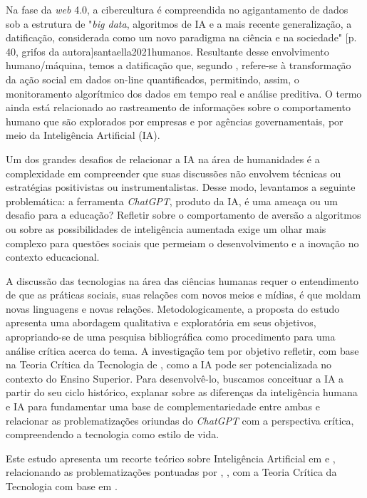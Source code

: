 \documentclass[portuguese]{textolivre}
\begin{document}
Na fase da \emph{web} 4.0, a cibercultura é compreendida no agigantamento de dados sob a estrutura de "\emph{big data}, algoritmos de IA e a mais recente generalização, a datificação, considerada como um novo paradigma na ciência e na sociedade" [p. 40, grifos da autora]{santaella2021humanos}. Resultante desse envolvimento humano/máquina, temos a datificação que, segundo \textcite{santaella2021humanos}, refere-se à transformação da ação social em dados on-line quantificados, permitindo, assim, o monitoramento algorítmico dos dados em tempo real e análise preditiva. O termo ainda está relacionado ao rastreamento de informações sobre o comportamento humano que são explorados por empresas e por agências governamentais, por meio da Inteligência Artificial (IA).

Um dos grandes desafios de relacionar a IA na área de humanidades é a complexidade em compreender que suas discussões não envolvem técnicas ou estratégias positivistas ou instrumentalistas. Desse modo, levantamos a seguinte problemática: a ferramenta \emph{ChatGPT}, produto da IA, é uma ameaça ou um desafio para a educação? Refletir sobre o comportamento de aversão a algoritmos \cite{feenberg2003, 2022kaufman} ou sobre as possibilidades de inteligência aumentada \cite{santaella2023inteligencia} exige um olhar mais complexo para questões sociais que permeiam o desenvolvimento e a inovação no contexto educacional.

A discussão das tecnologias na área das ciências humanas requer o entendimento de que as práticas sociais, suas relações com novos meios e mídias, é que moldam novas linguagens e novas relações. Metodologicamente, a proposta do estudo apresenta uma abordagem qualitativa e exploratória em seus objetivos, apropriando-se de uma pesquisa bibliográfica como procedimento para uma análise crítica acerca do tema. A investigação tem por objetivo refletir, com base na Teoria Crítica da Tecnologia de \textcite{feenberg2003, feenberg2004}, como a IA pode ser potencializada no contexto do Ensino Superior. Para desenvolvê-lo, buscamos conceituar a IA a partir do seu ciclo histórico, explanar sobre as diferenças da inteligência humana e IA para fundamentar uma base de complementariedade entre ambas e relacionar as problematizações oriundas do \emph{ChatGPT} com a perspectiva crítica, compreendendo a tecnologia como estilo de vida.

Este estudo apresenta um recorte teórico sobre Inteligência Artificial em \textcite{2022kaufman} e \textcite{santaella2021humanos, santaella2023inteligencia}, relacionando as problematizações pontuadas por \textcite{marques2023}, \textcite{demoraes2023}, com a Teoria Crítica da Tecnologia com base em \textcite{feenberg2003, feenberg2004}.
\end{document}

